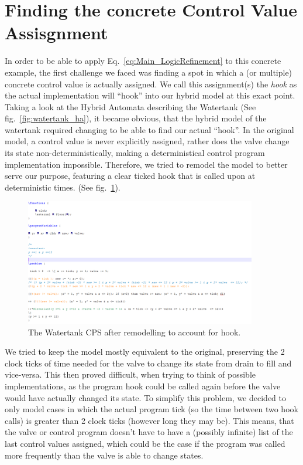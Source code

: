 \section{Finding the concrete Control Value Assisgnment}
\label{sec:Watertank:ControlValue}

In order to be able to apply Eq.~\ref{eq:Main_LogicRefinement} to this concrete example, the first challenge we faced was finding a spot in which a (or multiple) concrete control value is actually assigned. We call this assignment(s) the \textit{hook} as the actual implementation will ``hook'' into our hybrid model at this exact point. Taking a look at the Hybrid Automata describing the Watertank (See fig.~\ref{fig:watertank_ha}), it became obvious, that the hybrid model of the watertank required changing to be able to find our actual ``hook''. In the original model, a control value is never explicitly assigned, rather does the valve change its state non-deterministically, making a deterministical control program implementation impossible. Therefore, we tried to remodel the model to better serve our purpose, featuring a clear ticked hook that is called upon at deterministic times. (See fig.~\ref{fig:watertank_hp_ref}).

\begin{figure}
	\centering
	\includegraphics[width=0.9\textwidth]{images/watertank_hp_ref}
	\caption{The Watertank CPS after remodelling to account for hook.}
	\label{fig:watertank_hp_ref}
\end{figure}

We tried to keep the model mostly equivalent to the original, preserving the 2 clock ticks of time needed for the valve to change its state from drain to fill and vice-versa. This then proved difficult, when trying to think of possible implementations, as the program hook could be called again before the valve would have actually changed its state. To simplify this problem, we decided to only model cases in which the actual program tick (so the time between two hook calls)  is greater than 2 clock ticks (however long they may be).  This means, that the valve or control program doesn't have to have a (possibly infinite) list of the last control values assigned, which could be the case if the program was called more frequently than the valve is able to change states.

